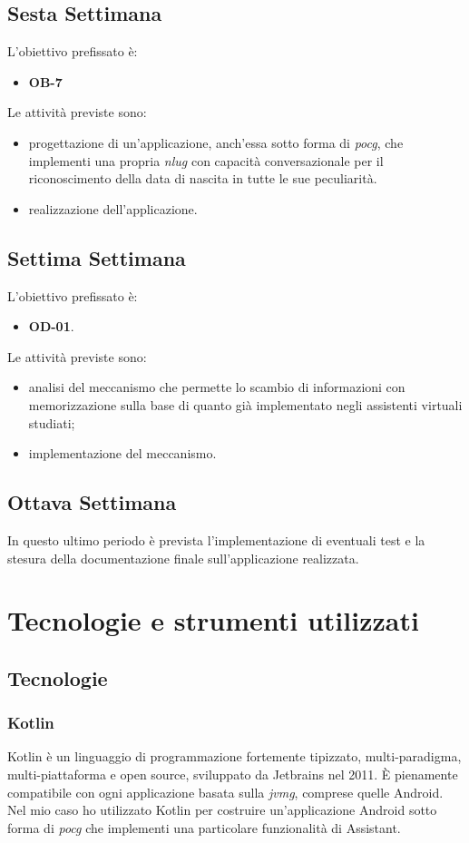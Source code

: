 	\subsection*{Sesta Settimana}
	L'obiettivo prefissato è:
	\begin{itemize}
		\item \textbf{OB-7}
	\end{itemize}
	Le attività previste sono:
	\begin{itemize}
		\item progettazione di un'applicazione, anch'essa sotto forma di \emph{\gls{pocg}}, che implementi una propria \emph{\gls{nlug}} con capacità conversazionale per il riconoscimento della data di nascita in tutte le sue peculiarità.
		\item realizzazione dell'applicazione.
	\end{itemize}
	\subsection*{Settima Settimana}
	L'obiettivo prefissato è:
	\begin{itemize}
		\item \textbf{OD-01}.
	\end{itemize}
	Le attività previste sono:
	\begin{itemize}
		\item analisi del meccanismo che permette lo scambio di informazioni con memorizzazione sulla base di quanto già implementato negli assistenti virtuali studiati;
		\item implementazione del meccanismo.
	\end{itemize}
	\subsection*{Ottava Settimana}
	In questo ultimo periodo è prevista l'implementazione di eventuali test e la stesura della documentazione finale sull'applicazione realizzata.

\section{Tecnologie e strumenti utilizzati}
	\subsection{Tecnologie}
		\subsubsection{Kotlin}
		Kotlin è un linguaggio di programmazione fortemente tipizzato, multi-paradigma, multi-piattaforma e open source, sviluppato da Jetbrains nel 2011. È pienamente compatibile con ogni applicazione basata sulla \emph{\gls{jvmg}}\glsfirstoccur, comprese quelle Android. Nel mio caso ho utilizzato Kotlin per costruire un'applicazione Android sotto forma di \emph{\gls{pocg}} che implementi una particolare funzionalità di Assistant.
